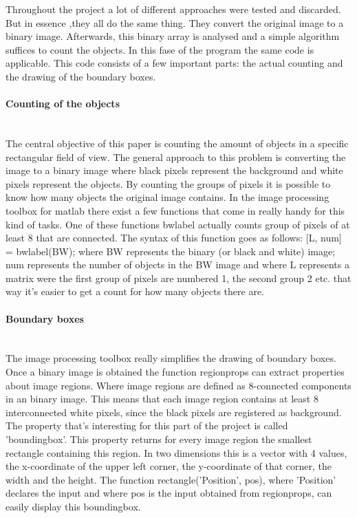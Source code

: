 \documentclass[11pt]{article}
\begin{document}
Throughout the project a lot of different approaches were tested and discarded. But in essence ,they all do the same thing. They convert the original image to a binary image. Afterwards, this binary array is analysed and a simple algorithm suffices to count the objects. In this fase of the program the same code is applicable. This code consists of a few important parts: the actual counting and the drawing of the boundary boxes. 
\paragraph{Counting of the objects}\mbox{}\\
The central objective of this paper is counting the amount of objects in a specific rectangular field of view. The general approach to this problem is converting the image to a binary image where black pixels represent the background and white pixels represent the objects. By counting the groups of pixels it is possible to know how many objects the original image contains. In the image processing toolbox for matlab there exist a few functions that come in really handy for this kind of tasks. One of these functions bwlabel actually counts group of pixels of at least 8 that are connected. The syntax of this function goes as follows: [L, num] = bwlabel(BW); where BW represents the binary (or black and white) image; num represents the number of objects in the BW image and where L represents a matrix were the first group of pixels are numbered 1, the second group 2 etc. that way it's easier to get a count for how many objects there are.

\paragraph{Boundary boxes}\mbox{}\\
The image processing toolbox really simplifies the drawing of boundary boxes. Once a binary image is obtained the function regionprops can extract properties about image regions. Where image regions are defined as 8-connected components in an binary image. This means that each image region contains at least 8 interconnected white pixels, since the black pixels are registered as background. The property that's interesting for this part of the project is called 'boundingbox'. This property returns for every image region the smallest rectangle containing this region. In two dimensions this is a vector with 4 values, the x-coordinate of the upper left corner, the y-coordinate of that corner, the width and the height. The function rectangle('Position', pos), where 'Position' declares the input and where pos is the input obtained from regionprops, can easily display this boundingbox. 
\end{document}
